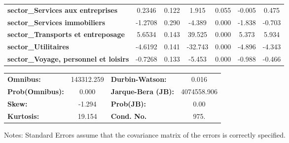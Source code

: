 \begin{center}
\begin{tabular}{lcccccc}
\textbf{sector\_Services aux entreprises}                             &       0.2346  &        0.122     &     1.915  &         0.055        &       -0.005    &        0.475     \\
\textbf{sector\_Services immobiliers}                                 &      -1.2708  &        0.290     &    -4.389  &         0.000        &       -1.838    &       -0.703     \\
\textbf{sector\_Transports et entreposage}                            &       5.6534  &        0.143     &    39.525  &         0.000        &        5.373    &        5.934     \\
\textbf{sector\_Utilitaires}                                          &      -4.6192  &        0.141     &   -32.743  &         0.000        &       -4.896    &       -4.343     \\
\textbf{sector\_Voyage, personnel et loisirs}                         &      -0.7268  &        0.133     &    -5.453  &         0.000        &       -0.988    &       -0.466     \\
\bottomrule
\end{tabular}
\begin{tabular}{lclc}
\textbf{Omnibus:}       & 143312.259 & \textbf{  Durbin-Watson:     } &      0.016   \\
\textbf{Prob(Omnibus):} &    0.000   & \textbf{  Jarque-Bera (JB):  } & 4074558.906  \\
\textbf{Skew:}          &   -1.294   & \textbf{  Prob(JB):          } &       0.00   \\
\textbf{Kurtosis:}      &   19.154   & \textbf{  Cond. No.          } &       975.   \\
\bottomrule
\end{tabular}
\end{center}

Notes: \newline
 [1] Standard Errors assume that the covariance matrix of the errors is correctly specified.